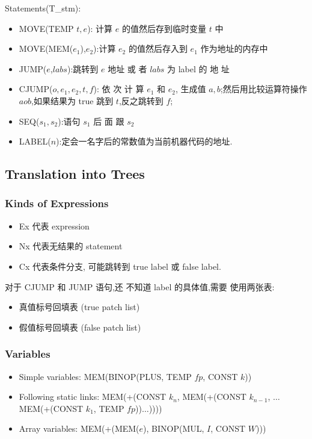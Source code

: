 Statements(T\_stm):
\begin{itemize}
    \item MOVE(TEMP $t, e$): 计算 $e$ 的值然后存到临时变量 $t$ 中
    \item MOVE(MEM($e_1$),$e_2$):计算 $e_2$ 的值然后存入到 $e_1$ 作为地址的内存中 
    \item JUMP($e$,$labs$):跳转到 $e$ 地址 或 者 $labs$ 为 label 的 地 址
    \item CJUMP($o,e_1,e_2,t,f$): 依 次 计 算 $e_1$ 和 $e_2$, 生成值 $a,b$;然后用比较运算符操作 $aob$,如果结果为 true 跳到 $t$,反之跳转到 $f$; 
    \item SEQ($s_1,s_2$):语句 $s_1$ 后 面 跟 $s_2$
    \item LABEL($n$):定会一名字后的常数值为当前机器代码的地址.
\end{itemize}


\subsection{Translation into Trees}
\subsubsection{Kinds of Expressions}
\begin{itemize}
    \item Ex 代表 expression
    \item Nx 代表无结果的 statement
    \item Cx 代表条件分支, 可能跳转到 true label 或 false label.
\end{itemize}

对于 CJUMP 和 JUMP 语句,还 不知道 label 的具体值,需要 使用两张表: 
\begin{itemize}
    \item 真值标号回填表 (true patch list)
    \item 假值标号回填表 (false patch list)
\end{itemize}

\subsubsection{Variables}
\begin{itemize}
    \item Simple variables: 
    \subitem MEM(BINOP(PLUS, TEMP $fp$, CONST $k$))
    \item Following static links:
    \subitem MEM(+(CONST $k_n$, MEM(+(CONST $k_{n-1}$, $\dots$ MEM(+(CONST $k_1$, TEMP $fp$))$\dots$))))
    \item Array variables: 
    \subitem MEM(+(MEM($e$), BINOP(MUL, $I$, CONST $W$)))
\end{itemize}

